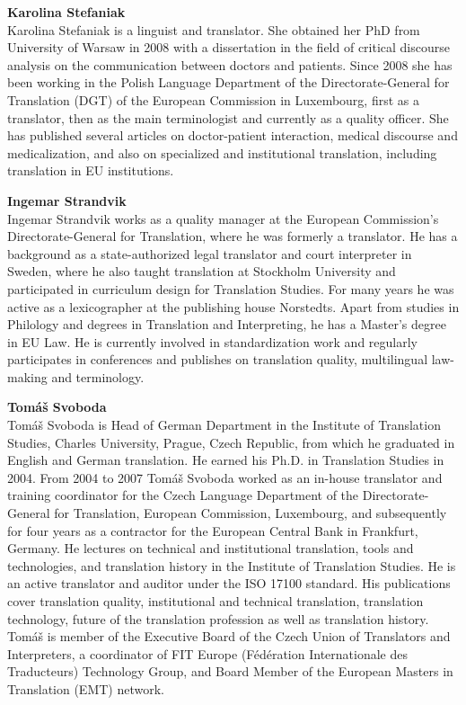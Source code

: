 \medskip\noindent
\textbf{Karolina Stefaniak }\\
Karolina Stefaniak is a linguist and translator. She obtained her PhD from University of Warsaw in 2008 with a dissertation in the field of critical discourse analysis on the communication between doctors and patients. Since 2008 she has been working in the Polish Language Department of the Directorate-General for Translation (DGT) of the European Commission in Luxembourg, first as a translator, then as the main terminologist and currently as a quality officer. She has published several articles on doctor-patient interaction, medical discourse and medicalization, and also on specialized and institutional translation, including translation in EU institutions. 

\medskip\noindent
\textbf{Ingemar Strandvik }\\
Ingemar Strandvik works as a quality manager at the European Commission’s Directorate-General for Translation, where he was formerly a translator. He has a background as a state-authorized legal translator and court interpreter in Sweden, where he also taught translation at Stockholm University and participated in curriculum design for Translation Studies. For many years he was active as a lexicographer at the publishing house Norstedts. Apart from studies in Philology and degrees in Translation and Interpreting, he has a Master’s degree in EU Law. He is currently involved in standardization work and regularly participates in conferences and publishes on translation quality, multilingual law-making and terminology.

\medskip\noindent
\textbf{Tomáš Svoboda}\\
Tomáš Svoboda is Head of German Department in the Institute of Translation Studies, Charles University, Prague, Czech Republic, from which he graduated in English and German translation. He earned his Ph.D. in Translation Studies in 2004. From 2004 to 2007 Tomáš Svoboda worked as an in-house translator and training coordinator for the Czech Language Department of the Directorate-General for Translation, European Commission, Luxembourg, and subsequently for four years as a contractor for the European Central Bank in Frankfurt, Germany. He lectures on technical and institutional translation, tools and technologies, and translation history in the Institute of Translation Studies. He is an active translator and auditor under the ISO 17100 standard. His publications cover translation quality, institutional and technical translation, translation technology, future of the translation profession as well as translation history. Tomáš is member of the Executive Board of the Czech Union of Translators and Interpreters, a coordinator of FIT Europe (Fédération Internationale des Traducteurs) Technology Group, and Board Member of the European Masters in Translation (EMT) network.

